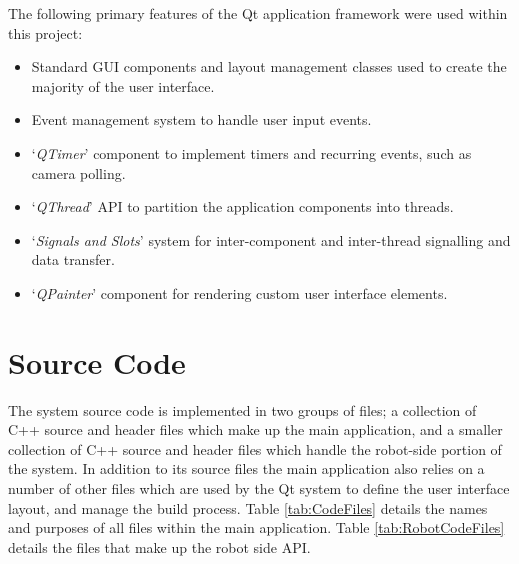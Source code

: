 The following primary features of the Qt application framework were used within this project:

\begin{itemize}
 \item Standard GUI components and layout management classes used to create the majority of the user interface.
 \item Event management system to handle user input events.
 \item `\textit{QTimer}' component to implement timers and recurring events, such as camera polling.
 \item `\textit{QThread}' API to partition the application components into threads.
 \item `\textit{Signals and Slots}' system for inter-component and inter-thread signalling and data transfer.
 \item `\textit{QPainter}' component for rendering custom user interface elements.
\end{itemize}


\section{Source Code}
The system source code is implemented in two groups of files; a collection of C++ source and header files which make up the main application, and a smaller collection of C++ source and header files which handle the robot-side portion of the system. In addition to its source files the main application also relies on a number of other files which are used by the Qt system to define the user interface layout, and manage the build process. Table \ref{tab:CodeFiles} details the names and purposes of all files within the main application. Table \ref{tab:RobotCodeFiles} details the files that make up the robot side API.


